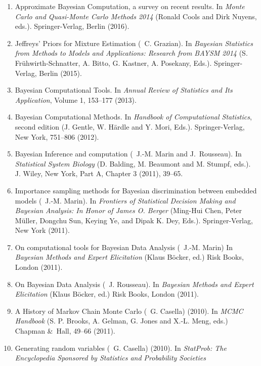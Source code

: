 \begin{enumerate}
\item Approximate Bayesian Computation, a survey on recent results. In {\em  Monte Carlo and Quasi-Monte Carlo Methods
2014} (Ronald Cools and Dirk Nuyens, eds.). Springer-Verlag, Berlin (2016).

\item Jeffreys’ Priors for Mixture Estimation (\avec\ C. Grazian). In
{\em Bayesian Statistics from Methods to Models and Applications: 
Research from BAYSM 2014} (S. Frühwirth-Schnatter, A. Bitto, G. Kastner, A. Posekany, Eds.). Springer-Verlag, Berlin
(2015).

\item Bayesian Computational Tools. In {\em Annual Review of Statistics and Its Application},  
Volume 1, 153--177 (2013).

\item Bayesian Computational Methods. In {\em Handbook of Computational
Statistics}, second edition (J. Gentle, W. H\"ardle and Y. Mori, Eds.). Springer-Verlag, 
New York, 751--806 (2012).

\item Bayesian Inference and computation (\avec\ J.-M. Marin and J.~Rousseau). In
{\em Statistical System Biology} (D. Balding, M. Beaumont and M. Stumpf, eds.). J. Wiley, New York, Part A,
Chapter 3 (2011), 39--65.

\item Importance sampling methods for Bayesian discrimination between embedded models
(\avec\ J.-M. Marin). In {\em Frontiers of Statistical Decision Making and Bayesian 
Analysis: In Honor of James O. Berger} (Ming-Hui Chen, Peter Müller, Dongchu Sun, Keying Ye,
and Dipak K. Dey, Eds.). Springer-Verlag, New York (2011).

\item On computational tools for Bayesian Data Analysis (\avec\ J.-M. Marin) 
In {\em Bayesian Methods and Expert Elicitation} (Klaus B\"ocker, ed.)
Risk Books, London (2011).

\item On Bayesian Data Analysis (\avec\ J. Rousseau).
In {\em Bayesian Methods and Expert Elicitation} (Klaus B\"ocker, ed.)
Risk Books, London (2011).

\item A History of Markov Chain Monte Carlo (\avec\ G. Casella) (2010). 
In {\em MCMC Handbook} (S. P. Brooks, A. Gelman, G. Jones and X.-L. Meng, eds.)
Chapman \&~Hall, 49--66 (2011).

\item Generating random variables (\avec~G. Casella) (2010).
In {\em StatProb: The Encyclopedia Sponsored by Statistics and Probability Societies}


\end{enumerate}
